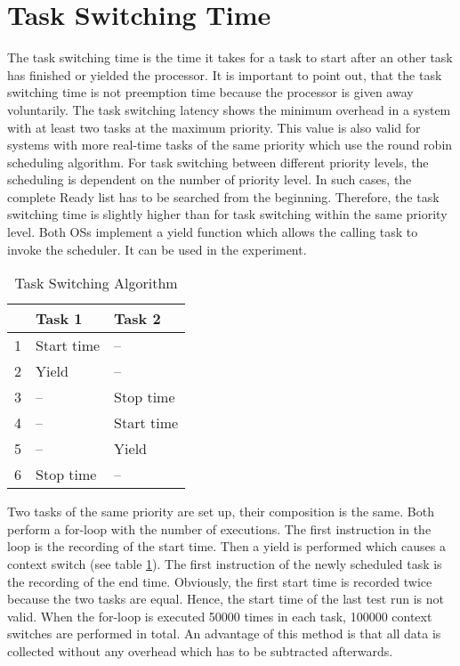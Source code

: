 \section{Task Switching Time} 
The task switching time is the time it takes for a task to start after an other task has finished or yielded the processor.
It is important to point out, that the task switching time is not preemption time because the processor is given away voluntarily.
The task switching latency shows the minimum overhead in a system with at least two tasks at the maximum priority. 
This value is also valid for systems with more real-time tasks of the same priority which use the round robin scheduling algorithm.
For task switching between different priority levels, the scheduling is dependent on the number of priority level.
In such cases, the complete Ready list has to be searched from the beginning.
Therefore, the task switching time is slightly higher than for task switching within the same priority level.
Both \acp{OS} implement a yield function which allows the calling task to invoke the scheduler.
It can be used in the experiment.

\begin{table}[htbp]
	\centering
		\begin{tabular}{|l|l|l|}
			\hline
				& Task 1							& Task 2						\\
				\hline 
			  1 & Start time					& --								\\
			  2 & Yield								& --								\\
			  3 & --									& Stop time					\\ 
			  4 & --									& Start time				\\
			  5 & --									& Yield							\\
			  6 & Stop time						& --								\\ 			  
			\hline
		\end{tabular}
	\caption{Task Switching Algorithm}
	\label{tab_task_switching}
\end{table}

Two tasks of the same priority are set up, their composition is the same. 
Both perform a for-loop with the number of executions.
The first instruction in the loop is the recording of the start time.
Then a yield is performed which causes a context switch (see table \ref{tab_task_switching}). 
The first instruction of the newly scheduled task is the recording of the end time.
Obviously, the first start time is recorded twice because the two tasks are equal.
Hence, the start time of the last test run is not valid.
When the for-loop is executed 50000 times in each task, 100000 context switches are performed in total.
An advantage of this method is that all data is collected without any overhead which has to be subtracted afterwards.
 
